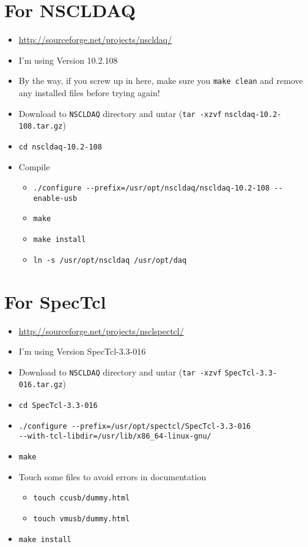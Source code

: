 \documentclass[11pt]{article}
\begin{document}
\section*{For NSCLDAQ}
\label{sec-3}
\begin{itemize}
\item \url{http://sourceforge.net/projects/nscldaq/}
\item I'm using Version 10.2.108
\item By the way, if you screw up in here, make sure you \verb~make clean~
and remove any installed files before trying again!
\item Download to \verb~NSCLDAQ~ directory and untar (\verb~tar -xzvf~
    \verb~nscldaq-10.2-108.tar.gz~)
\item \verb~cd nscldaq-10.2-108~
\item Compile
\begin{itemize}
\item \verb~./configure --prefix=/usr/opt/nscldaq/nscldaq-10.2-108 --enable-usb~
\item \verb~make~
\item \verb~make install~
\item \verb~ln -s /usr/opt/nscldaq /usr/opt/daq~
\end{itemize}
\end{itemize}
\section*{For SpecTcl}
\label{sec-4}
\begin{itemize}
\item \url{http://sourceforge.net/projects/nsclspectcl/}
\item I'm using Version SpecTcl-3.3-016
\item Download to \verb~NSCLDAQ~ directory and untar (\verb~tar -xzvf~
    \verb~SpecTcl-3.3-016.tar.gz~)
\item \verb~cd SpecTcl-3.3-016~
\item \verb~./configure --prefix=/usr/opt/spectcl/SpecTcl-3.3-016~\\
    \verb~--with-tcl-libdir=/usr/lib/x86_64-linux-gnu/~
\item \verb~make~
\item Touch some files to avoid errors in documentation
\begin{itemize}
\item \verb~touch ccusb/dummy.html~
\item \verb~touch vmusb/dummy.html~
\end{itemize}
\item \verb~make install~
\end{itemize}
\end{document}
